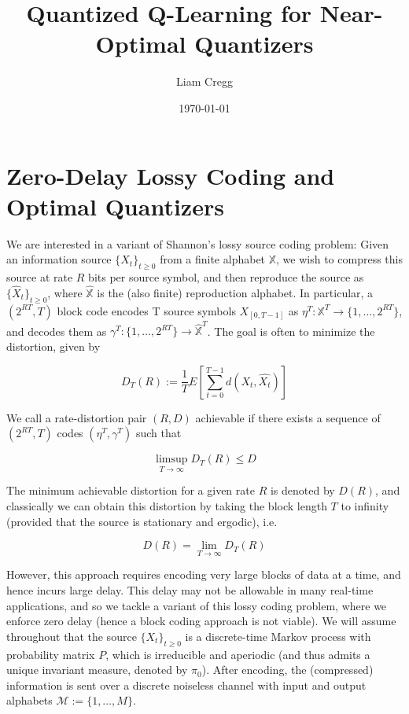 \documentclass{article}
\title{Quantized Q-Learning for Near-Optimal Quantizers}
\date{\today}
\author{Liam Cregg}
\begin{document}
\begin{titlepage}
    \maketitle
\end{titlepage}

\newpage

\section{Zero-Delay Lossy Coding and Optimal Quantizers}\label{optimal quantizers}
We are interested in a variant of Shannon's lossy source coding problem: Given an information source \( \{X_t\}_{t\ge0} \) from a finite alphabet \( \mathbb{X} \), we wish to compress this source at rate \(R\) bits per source symbol, and then reproduce the source as \( \{\hat{X}_t\}_{t\ge0} \), where \(\hat{\mathbb{X}}\) is the (also finite) reproduction alphabet. In particular, a \((2^{RT},T)\) block code encodes T source symbols \(X_{[0,T-1]}\) as \(\eta^T : \mathbb{X}^T \to \{1,\ldots,2^{RT}\} \), and decodes them as \( \gamma^T : \{1,\ldots,2^{RT}\} \to \hat{\mathbb{X}}^T \). The goal is often to minimize the distortion, given by %

\[ D_T(R) := \frac{1}{T} E[\sum_{t=0}^{T-1}d(X_t,\hat{X_t})]\] %

We call a rate-distortion pair \((R,D)\) achievable if there exists a sequence of \((2^{RT},T)\) codes \((\eta^T,\gamma^T)\) such that

\[ \limsup_{T \to \infty}D_T(R) \le D\]

The minimum achievable distortion for a given rate \(R\) is denoted by \(D(R)\), and classically we can obtain this distortion by taking the block length \(T\) to infinity (provided that the source is stationary and ergodic), i.e.

\[D(R) = \lim_{T \to  \infty}D_T(R)\]

However, this approach requires encoding very large blocks of data at a time, and hence incurs large delay. This delay may not be allowable in many real-time applications, and so we tackle a variant of this lossy coding problem, where we enforce zero delay (hence a block coding approach is not viable). We will assume throughout that the source \( \{X_t\}_{t \ge 0} \) is a discrete-time Markov process with probability matrix \( P \), which is irreducible and aperiodic (and thus admits a unique invariant measure, denoted by \( \pi_0 \)). After encoding, the (compressed) information is sent over a discrete noiseless channel with input and output alphabets \( \mathcal{M} := \{1,\ldots,M\} \). %
\end{document}
